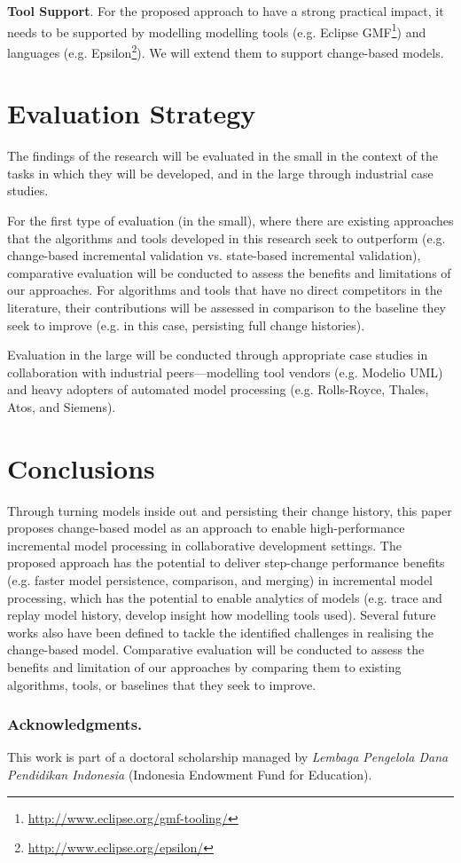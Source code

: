 \documentclass{llncs}
\begin{document}
\textbf{Tool Support}. For the proposed approach to have a strong practical impact, it needs to be supported by modelling modelling tools (e.g. Eclipse GMF\footnote{\url{http://www.eclipse.org/gmf-tooling/}}) and languages (e.g. Epsilon\footnote{\url{http://www.eclipse.org/epsilon/}}). We will extend them to support change-based models.

\section{Evaluation Strategy}
\label{Evaluation Strategy}
The findings of the research will be evaluated in the small in the context of the tasks in which they will be developed, and in the large through industrial case studies.

For the first type of evaluation (in the small), where there are existing approaches that the algorithms and tools developed in this research seek to outperform (e.g. change-based incremental validation vs. state-based incremental validation), comparative evaluation will be conducted to assess the benefits and limitations of our approaches. For algorithms and tools that have no direct competitors in the literature, their contributions will be assessed in comparison to the baseline they seek to improve (e.g. in this case, persisting full change histories).

Evaluation in the large will be conducted through appropriate case studies in collaboration with industrial peers---modelling tool vendors (e.g. Modelio UML) and heavy adopters of automated model processing (e.g. Rolls-Royce, Thales, Atos, and Siemens).

\section{Conclusions}
\label{Conclusions}
Through turning models inside out and persisting their change history, this paper proposes change-based model as an approach to enable high-performance incremental model processing in collaborative development settings. The proposed approach has the potential to deliver step-change performance benefits (e.g. faster model persistence, comparison, and merging) in incremental model processing, which has the potential to enable analytics of models (e.g. trace and replay model history, develop insight how modelling tools used). Several future works also have been defined to tackle the identified challenges in realising the change-based model. Comparative evaluation will be conducted to assess the benefits and limitation of our approaches by comparing them to existing algorithms, tools, or baselines that they seek to improve.

\subsubsection*{Acknowledgments.} This work is part of a doctoral scholarship managed by \emph{Lembaga Pengelola Dana Pendidikan Indonesia} (Indonesia Endowment Fund for Education).

 

\end{document}
